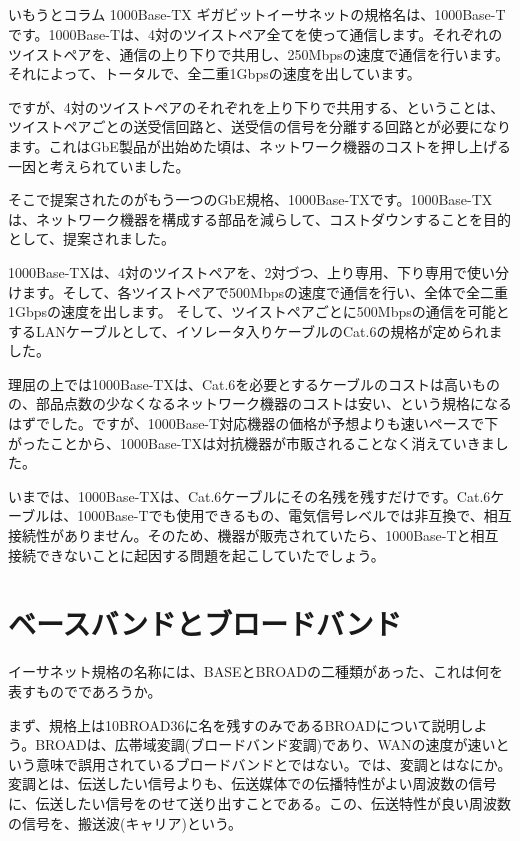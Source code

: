 \subsection*{}
\begin{itembox}[l]{いもうとコラム 1000Base-TX}
ギガビットイーサネットの規格名は、1000Base-Tです。1000Base-Tは、4対のツイストペア全てを使って通信します。それぞれのツイストペアを、通信の上り下りで共用し、250Mbpsの速度で通信を行います。それによって、トータルで、全二重1Gbpsの速度を出しています。

ですが、4対のツイストペアのそれぞれを上り下りで共用する、ということは、ツイストペアごとの送受信回路と、送受信の信号を分離する回路とが必要になります。これはGbE製品が出始めた頃は、ネットワーク機器のコストを押し上げる一因と考えられていました。

そこで提案されたのがもう一つのGbE規格、1000Base-TXです。1000Base-TXは、ネットワーク機器を構成する部品を減らして、コストダウンすることを目的として、提案されました。

1000Base-TXは、4対のツイストペアを、2対づつ、上り専用、下り専用で使い分けます。そして、各ツイストペアで500Mbpsの速度で通信を行い、全体で全二重1Gbpsの速度を出します。
そして、ツイストペアごとに500Mbpsの通信を可能とするLANケーブルとして、イソレータ入りケーブルのCat.6の規格が定められました。

理屈の上では1000Base-TXは、Cat.6を必要とするケーブルのコストは高いものの、部品点数の少なくなるネットワーク機器のコストは安い、という規格になるはずでした。ですが、1000Base-T対応機器の価格が予想よりも速いペースで下がったことから、1000Base-TXは対抗機器が市販されることなく消えていきました。

いまでは、1000Base-TXは、Cat.6ケーブルにその名残を残すだけです。Cat.6ケーブルは、1000Base-Tでも使用できるもの、電気信号レベルでは非互換で、相互接続性がありません。そのため、機器が販売されていたら、1000Base-Tと相互接続できないことに起因する問題を起こしていたでしょう。


\end{itembox}


\section{ベースバンドとブロードバンド}

イーサネット規格の名称には、BASEとBROADの二種類があった、これは何を表すものでであろうか。

まず、規格上は10BROAD36に名を残すのみであるBROADについて説明しよう。BROADは、広帯域変調(ブロードバンド変調)であり、WANの速度が速いという意味で誤用されているブロードバンドとではない。では、変調とはなにか。変調とは、伝送したい信号よりも、伝送媒体での伝播特性がよい周波数の信号に、伝送したい信号をのせて送り出すことである。この、伝送特性が良い周波数の信号を、搬送波(キャリア)という。

